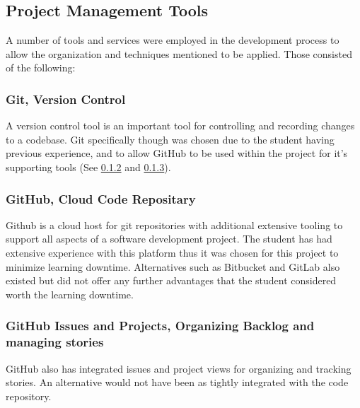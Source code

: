 \subsection{Project Management Tools} \label{projectmanage}
A number of tools and services were employed in the development process to allow the organization and techniques mentioned to be applied. Those consisted of the following:

\subsubsection{Git, Version Control}
A version control tool is an important tool for controlling and recording changes to a codebase.
Git specifically though was chosen due to the student having previous experience, and to allow GitHub to be used within the project for it's supporting tools (See \ref{github} and \ref{github2}).

\subsubsection{GitHub, Cloud Code Repositary} \label{github}
Github is a cloud host for git repositories with additional extensive tooling to support all aspects of a software development project. The student has had extensive experience with this platform thus it was chosen for this project to minimize learning downtime. Alternatives such as Bitbucket and GitLab also existed but did not offer any further advantages that the student considered worth the learning downtime.

\subsubsection{GitHub Issues and Projects, Organizing Backlog and managing stories} \label{github2}
GitHub also has integrated issues and project views for organizing and tracking stories. An alternative would not have been as tightly integrated with the code repository.

